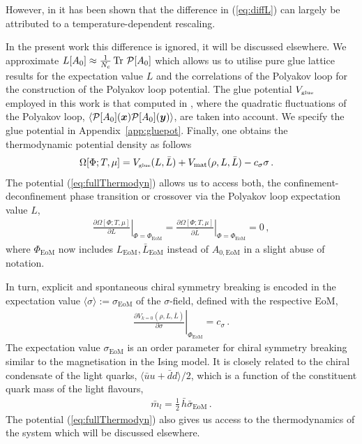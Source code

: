 \documentclass[%
reprint,
superscriptaddress,
showpacs,preprintnumbers,
 amsmath,amssymb,
 aps,
prd,
]{revtex4-1}
\newcommand{\Tr}{\ensuremath{\operatorname{Tr}}}
\def\eq#1{(\ref{#1})}
\def\app#1{Appendix~\ref{#1}}
\def\0#1#2{\frac{#1}{#2}}
\begin{document}
However, in \cite{Herbst:2015ona} it
has been shown that the difference in \eq{eq:diffL} can largely be
attributed to a temperature-dependent rescaling.

In the present work this difference is ignored, it will be discussed
elsewhere. We approximate
$ L[A_0] \approx \frac{1}{N_c} \Tr\, {\cal P}[A_0]$ which allows us to
utilise pure glue lattice results for the expectation value $L$ and
the correlations of the Polyakov loop for the construction of the
Polyakov loop potential. The glue potential $V_{\text{\tiny{glue}}}$
employed in this work is that computed in \cite{Lo:2013hla}, where the
quadratic fluctuations of the Polyakov loop,
$\langle {\cal P}[A_0](\bm x) {\cal P}[A_0](\bm y)\rangle$, are taken
into account. We specify the glue potential in
\app{app:gluepot}. Finally, one obtains the thermodynamic potential
density as follows
%
\begin{align}\label{eq:fullThermodyn}
  \Omega[\Phi;T,\mu]&=V_{\text{\tiny{glue}}}(L, \bar
                      L)+V_\text{mat}(\rho,L,\bar L)-c_\sigma\sigma\,. 
\end{align}
%
The potential \eq{eq:fullThermodyn} allows us to access both, the
confinement-deconfinement phase transition or crossover via the
Polyakov loop expectation value $L$,
%
\begin{align}\label{eq:EoMPolloop}
  \left.  \0{\partial\Omega[\Phi;T,\mu]}{\partial L}
  \right|_{\Phi=\Phi_\textrm{EoM}} =
  \left.  \0{\partial \Omega[\Phi;T,\mu]}{\partial
  \bar L}\right|_{\Phi=\Phi_\textrm{EoM}} =0\,, 
\end{align}
%
where $\Phi_\textrm{EoM}$ now includes
$L_\textrm{EoM}, \bar L_\textrm{EoM} $ instead of
$A_{0,\textrm{EoM}} $ in a slight abuse of notation.

In turn, explicit and spontaneous chiral symmetry breaking is encoded
in the expectation value
$\langle \sigma\rangle := \sigma_\textrm{EoM}$ of the $\sigma$-field,
defined with the respective EoM,
%
\begin{align}\label{eq:EoMsigma}
  \left.  \0{\partial V_{k=0}(\rho,L,\bar L)}{\partial \sigma}
  \right|_{\Phi_\textrm{EoM}} = c_\sigma\,. 
\end{align}
%
The expectation value $\sigma_\textrm{EoM}$ is an order parameter for
chiral symmetry breaking similar to the magnetisation in the Ising
model. It is closely related to the chiral condensate of the light
quarks, $\langle \bar u u +\bar d d\rangle/2$, which is a function of
the constituent quark mass of the light flavours,
%
\begin{align}\label{eq:mqlight}
 \bar m_l= \frac12\, \bar h \bar \sigma_\textrm{EoM}\,.
\end{align}
%
The potential \eq{eq:fullThermodyn} also gives us access to the
thermodynamics of the system which will be discussed elsewhere.
\end{document}
